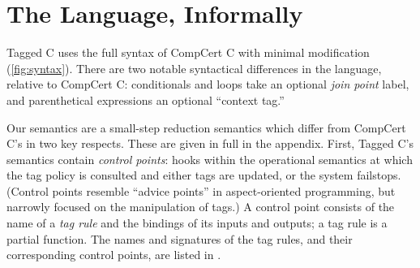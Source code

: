 \documentclass{llncs}
\begin{document}

\section{The Language, Informally}

Tagged C uses the full syntax of CompCert C \cite{Leroy09:CompCert} with minimal modification (\cref{fig:syntax}).
There are two notable syntactical differences in the language, relative to CompCert C:
conditionals and loops take an optional {\em join point} label, and parenthetical expressions
an optional ``context tag.''

Our semantics are a small-step reduction semantics which differ from CompCert C's in
two key respects. These are given in full in the appendix. First, Tagged C's semantics contain
{\em control points}: hooks within the
operational semantics at which the tag policy is consulted and either tags are updated, or the system
failstops. (Control points resemble ``advice points'' in aspect-oriented programming, but narrowly
focused on the manipulation of tags.) A control point consists of the name of a {\em tag rule}
and the bindings of its inputs and outputs; a tag rule is a partial function. The names and
signatures of the tag rules, and their corresponding control points, are listed in .
\end{document}
